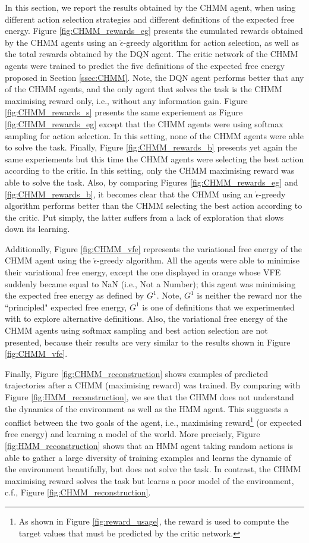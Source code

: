 \documentclass[twoside,11pt]{article}
\begin{document}
In this section, we report the results obtained by the CHMM agent, when using different action selection strategies and different definitions of the expected free energy. Figure \ref{fig:CHMM_rewards_eg} presents the cumulated rewards obtained by the CHMM agents using an $\mathring{\epsilon}$-greedy algorithm for action selection, as well as the total rewards obtained by the DQN agent. The critic network of the CHMM agents were trained to predict the five definitions of the expected free energy proposed in Section \ref{ssec:CHMM}. Note, the DQN agent performs better that any of the CHMM agents, and the only agent that solves the task is the CHMM maximising reward only, i.e., without any information gain. Figure \ref{fig:CHMM_rewards_s} presents the same experiement as Figure \ref{fig:CHMM_rewards_eg} except that the CHMM agents were using softmax sampling for action selection. In this setting, none of the CHMM agents were able to solve the task. Finally, Figure \ref{fig:CHMM_rewards_b} presents yet again the same experiements but this time the CHMM agents were selecting the best action according to the critic. In this setting, only the CHMM maximising reward was able to solve the task. Also, by comparing Figures \ref{fig:CHMM_rewards_eg} and \ref{fig:CHMM_rewards_b}, it becomes clear that the CHMM using an $\mathring{\epsilon}$-greedy algorithm performs better than the CHMM selecting the best action according to the critic. Put simply, the latter suffers from a lack of exploration that slows down its learning. 

Additionally, Figure \ref{fig:CHMM_vfe} represents the variational free energy of the CHMM agent using the $\mathring{\epsilon}$-greedy algorithm. All the agents were able to minimise their variational free energy, except the one displayed in orange whose VFE suddenly became equal to NaN (i.e., Not a Number); this agent was minimising the expected free energy as defined by $G^1$. Note, $G^1$ is neither the reward nor the ``principled" expected free energy, $G^1$ is one of definitions that we experimented with to explore alternative definitions. Also, the variational free energy of the CHMM agents using softmax sampling and best action selection are not presented, because their results are very similar to the results shown in Figure \ref{fig:CHMM_vfe}.

Finally, Figure \ref{fig:CHMM_reconstruction} shows examples of predicted trajectories after a CHMM (maximising reward) was trained. By comparing with Figure \ref{fig:HMM_reconstruction}, we see that the CHMM does not understand the dynamics of the environment as well as the HMM agent. This sugguests a conflict between the two goals of the agent, i.e., maximising reward\footnote{ As shown in Figure \ref{fig:reward_usage}, the reward is used to compute the target values that must be predicted by the critic network.} (or expected free energy) and learning a model of the world. More precisely, Figure \ref{fig:HMM_reconstruction} shows that an HMM agent taking random actions is able to gather a large diversity of training examples and learns the dynamic of the environment beautifully, but does not solve the task. In contrast, the CHMM maximising reward solves the task but learns a poor model of the environment, c.f., Figure \ref{fig:CHMM_reconstruction}.
\end{document}
